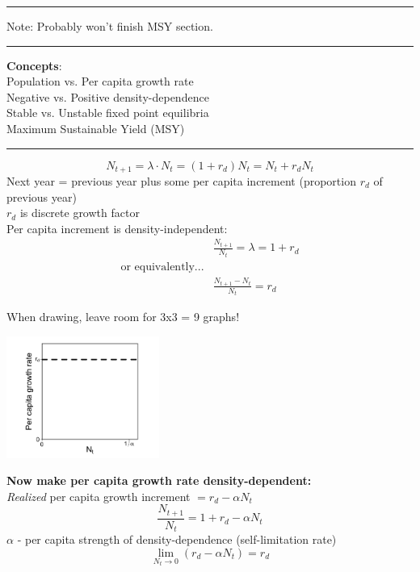 \documentclass{article}
\newcommand{\note}[1]{\colorbox{gray!30}{#1}}
\newcommand{\ind}{\-\hspace{1cm}}
\begin{document}
\noindent{}

\rule[0.5ex]{\linewidth}{1pt}
\begin{center}
	\note{Note: Probably won't finish MSY section.}
\end{center}
\rule[0.5ex]{\linewidth}{1pt}

\textbf{Concepts}: \\
\ind Population vs. Per capita growth rate \\
\ind Negative vs. Positive density-dependence \\
\ind Stable vs. Unstable fixed point equilibria \\
\ind Maximum Sustainable Yield (MSY)

\rule[0.5ex]{\linewidth}{1pt}

\begin{equation*}
	N_{t+1}=\lambda \cdot N_t = (1+r_d) N_t = N_t + r_d N_t
\end{equation*}
	Next year = previous year plus some per capita increment (proportion $r_d$ of previous year)\\
\ind	$r_d$ is discrete growth factor\\
		
Per capita increment is density-independent:
\begin{align*}
&	\frac{N_{t+1}}{N_t}=\lambda = 1+r_d \\
	\text{or equivalently...}&\\
&	\frac{N_{t+1}-N_t}{N_t}=r_d
\end{align*}

\note{When drawing, leave room for 3x3 = 9 graphs!}
\begin{center}
\includegraphics[width=5cm]{figs/percap.jpg}
\end{center}

\textbf{Now make per capita growth rate density-dependent:}\\
\emph{Realized} per capita growth increment $=r_d-\alpha N_t$
\begin{equation*}
	\frac{N_{t+1}}{N_t}=1+r_d-\alpha N_t
\end{equation*}
\ind $\alpha$ - per capita strength of density-dependence (self-limitation rate)\\
\begin{equation*}
\lim_{N_t \to 0} (r_d-\alpha N_t)=r_d
\end{equation*}
\end{document}
